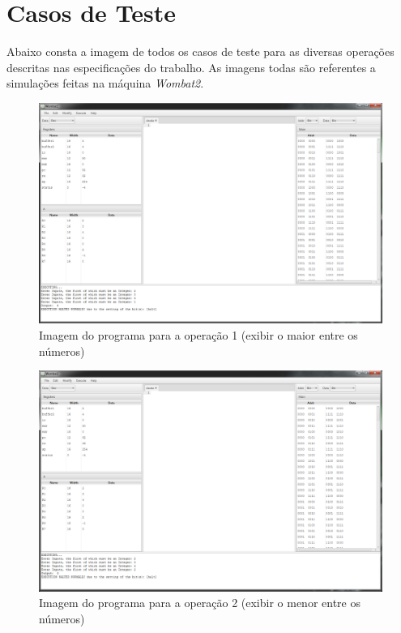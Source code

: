 \documentclass{article}
\begin{document}
\section{Casos de Teste}

Abaixo consta a imagem de todos os casos de teste para as diversas operações descritas nas especificações do trabalho. As imagens todas são referentes a simulações feitas na máquina \textit{Wombat2}.

\begin{figure}[!]
\centering
\includegraphics[scale=0.34]{1.png}
\caption{Imagem do programa para a operação 1 (exibir o maior entre os números)}
\label{fig:ibagem1}
\end{figure}

\begin{figure}[!]
\centering
\includegraphics[scale=0.34]{2.png}
\caption{Imagem do programa para a operação 2 (exibir o menor entre os números)}
\label{fig:ibagem2}
\end{figure}
\end{document}

